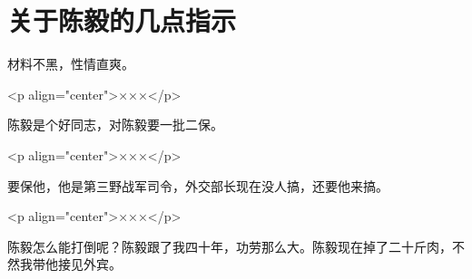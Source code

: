 \section[关于陈毅的几点指示（一九六七年八月十一日）]{关于陈毅的几点指示}


材料不黑，性情直爽。

<p align="center">×××</p>

陈毅是个好同志，对陈毅要一批二保。

<p align="center">×××</p>

要保他，他是第三野战军司令，外交部长现在没人搞，还要他来搞。

<p align="center">×××</p>

陈毅怎么能打倒呢？陈毅跟了我四十年，功劳那么大。陈毅现在掉了二十斤肉，不然我带他接见外宾。

